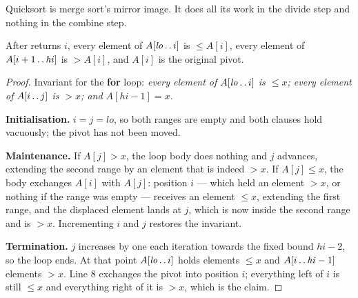 Quicksort is merge sort's mirror image. It does all its work in the divide
step and nothing in the combine step.



\begin{theorem}\label{thm:partition}
After  returns $i$, every element of
$A[\mathit{lo}\mathinner{\ldotp\ldotp}i]$ is $\le A[i]$, every element of
$A[i+1\mathinner{\ldotp\ldotp}\mathit{hi}]$ is $> A[i]$, and $A[i]$ is the
original pivot.
\end{theorem}

\begin{proof}
Invariant for the \textbf{for} loop: \emph{every element of
$A[\mathit{lo}\mathinner{\ldotp\ldotp}i]$ is $\le x$; every element of
$A[i\mathinner{\ldotp\ldotp}j]$ is $> x$; and $A[\mathit{hi}-1] = x$.}

\smallskip
\textbf{Initialisation.} $i = j = \mathit{lo}$, so both ranges are empty and
both clauses hold vacuously; the pivot has not been moved.

\smallskip
\textbf{Maintenance.} If $A[j] > x$, the loop body does nothing and $j$
advances, extending the second range by an element that is indeed $> x$. If
$A[j] \le x$, the body exchanges $A[i]$ with $A[j]$: position $i$ --- which
held an element $> x$, or nothing if the range was empty --- receives an
element $\le x$, extending the first range, and the displaced element lands at
$j$, which is now inside the second range and is $> x$. Incrementing $i$ and
$j$ restores the invariant.

\smallskip
\textbf{Termination.} $j$ increases by one each iteration towards the fixed
bound $\mathit{hi}-2$, so the loop ends. At that point $A[\mathit{lo}
\mathinner{\ldotp\ldotp}i]$ holds elements $\le x$ and $A[i\mathinner{\ldotp
\ldotp}\mathit{hi}-1]$ elements $> x$. Line 8 exchanges the pivot into position
$i$; everything left of $i$ is still $\le x$ and everything right of it is
$> x$, which is the claim.
\end{proof}

